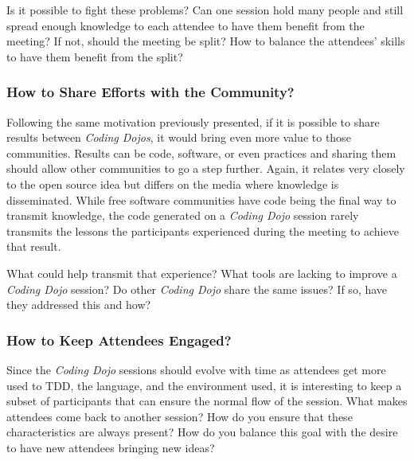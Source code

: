 Is it possible to fight these problems? Can one session hold many
people and still spread enough knowledge to each attendee to have them
benefit from the meeting? If not, should the meeting be split? How
to balance the attendees' skills to have them benefit from the split?

\subsubsection{How to Share Efforts with the Community?}

Following the same motivation previously presented, if it is possible
to share results between \emph{Coding Dojos}, it would bring even
more value to those communities. Results can be code, software, or
even practices and sharing them should allow other communities to go a
step further. Again, it relates very closely to the open source
idea but differs on the media where knowledge is disseminated. While
free software communities have code being the final way to transmit
knowledge, the code generated on a \emph{Coding Dojo} session rarely
transmits the lessons the participants experienced during the meeting
to achieve that result.

What could help transmit that experience? What tools are lacking to
improve a \emph{Coding Dojo} session? Do other \emph{Coding Dojo}
share the same issues? If so, have they addressed this and how?

\subsubsection{How to Keep Attendees Engaged?}

Since the \textit{Coding Dojo} sessions should evolve with time as
attendees get more used to TDD, the language, and the environment used,
it is interesting to keep a subset of participants that can ensure the
normal flow of the session. What makes attendees come back to another
session? How do you ensure that these characteristics are always present?
How do you balance this goal with the desire to have new attendees bringing
new ideas?